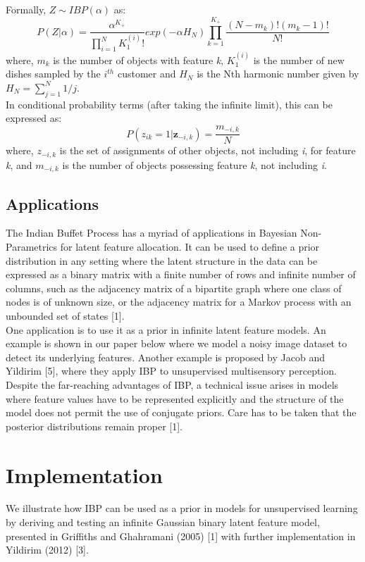 \documentclass[11pt]{article}
\begin{document}
Formally, $Z \sim IBP(\alpha)$ as:
\begin{equation}
P(Z|\alpha) =\frac{\alpha^{K_+}}{\prod_{i=1}^{N}K_1^{(i)}!}exp(-\alpha H_N)\prod_{k=1}^{K_+}\frac{(N-m_k)!(m_k-1)!}{N!} 
\end{equation}
where, $m_{k}$ is the number of objects with feature \textit{k}, $K_1^{(i)}$ is the number of new dishes sampled by the $i^{th}$ customer and $H_N$ is the Nth harmonic number given by $H_N=\sum_{j=1}^{N} 1/j$.\\

In conditional probability terms (after taking the infinite limit), this can be expressed as:
$$
P(z_{ik}=1|\textbf{z}_{-i,k}) = \frac{m_{-i,k}}{N}
$$
where, ${z}_{-i,k}$ is the set of assignments of other objects, not including \textit{i}, for feature \textit{k}, and ${m}_{-i,k}$ is the number of objects possessing feature \textit{k}, not including \textit{i}.

\subsection{Applications}
The Indian Buffet Process has a myriad of applications in Bayesian Non-Parametrics for latent feature allocation. It can be used to define a prior distribution in any setting where the latent structure in the data can be expressed as a binary matrix with a finite number of rows and infinite number of columns, such as the adjacency matrix of a bipartite graph where one class of nodes is of unknown size, or the adjacency matrix for a Markov process with an unbounded set of states [1].\\

One application is to use it as a prior in infinite latent feature models. An example is shown in our paper below where we model a noisy image dataset to detect its underlying features. Another example is proposed by Jacob and Yildirim [5], where they apply IBP to unsupervised multisensory perception.\\

Despite the far-reaching advantages of IBP, a technical issue arises in models where feature values have to be represented explicitly and the structure of the model does not permit the use of conjugate priors. Care has to be taken that the posterior distributions remain proper [1].

\section{Implementation}
We illustrate how IBP can be used as a prior in models for unsupervised learning by deriving and testing an infinite Gaussian binary latent feature model, presented in Griffiths and Ghahramani (2005) [1] with further implementation in Yildirim (2012) [3].
\end{document}
